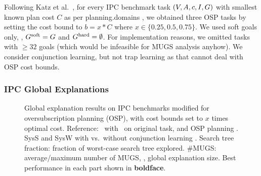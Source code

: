 Following Katz et al.\ , for every IPC
benchmark task $(V,A,{c},I,G)$ with smallest known
plan cost $C$ as per planning.domains \cite{muise:icaps-demos-16}, we
obtained three OSP tasks by setting the cost bound to $b = x * C$
where $x \in \{0.25, 0.5, 0.75\}$. We used soft goals only, \ie,
$G^{\text{\textup{soft}}} = G$ and $G^{\text{\textup{hard}}}=\emptyset$. For implementation
reasons, we omitted tasks with $\geq 32$ goals (which would be
infeasible for MUGS analysis anyhow).
%
%
%
%
We consider conjunction learning, but not trap learning as that cannot
deal with OSP cost bounds.
%


\subsubsection{IPC Global Explanations}

\setlength{\tabcolsep}{2pt}
\renewcommand{\arraystretch}{0.8}
\begin{figure*}[h!]
\tiny
%
\centering  
%
\vspace{-0.2cm}
\caption{\label{table:coverage_ipc} Global explanation results on IPC benchmarks modified 
for oversubscription planning (OSP), with cost bounds set to $x$ times
optimal cost. Reference: \astar\ with \hlmcut\ on original task, and
OSP planning \cite{katz:etal:icaps-19}. SysS and SysW with vs.\
without conjunction learning \hc. Search tree fraction: fraction of
worst-case search tree explored. \#MUGS: average/maximum number of
MUGS, \ie, global explanation size. Best performance in each part
shown in \textbf{boldface}.}
\vspace{-0.5cm}
\end{figure*}

